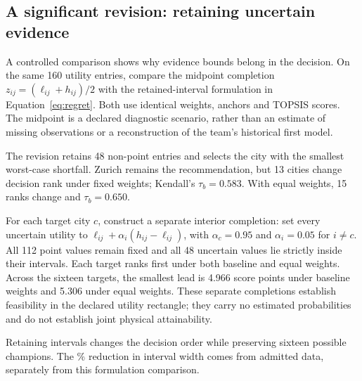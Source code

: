 \subsection{A significant revision: retaining uncertain evidence}
A controlled comparison shows why evidence bounds belong in the decision.
On the same 160 utility entries, compare the midpoint completion $z_{ij}=(\ell_{ij}+h_{ij})/2$ with the retained-interval formulation in Equation~\ref{eq:regret}. Both use identical weights, anchors and TOPSIS scores. The midpoint is a declared diagnostic scenario, rather than an estimate of missing observations or a reconstruction of the team's historical first model.

The revision retains 48 non-point entries and selects the city with the smallest worst-case shortfall. Zurich remains the recommendation, but 13 cities change decision rank under fixed weights; Kendall's $\tau_b=0.583$. With equal weights, 15 ranks change and $\tau_b=0.650$.

For each target city $c$, construct a separate interior completion: set every uncertain utility to $\ell_{ij}+\alpha_i(h_{ij}-\ell_{ij})$, with $\alpha_c=0.95$ and $\alpha_i=0.05$ for $i\ne c$. All 112 point values remain fixed and all 48 uncertain values lie strictly inside their intervals. Each target ranks first under both baseline and equal weights. Across the sixteen targets, the smallest lead is 4.966 score points under baseline weights and 5.306 under equal weights. These separate completions establish feasibility in the declared utility rectangle; they carry no estimated probabilities and do not establish joint physical attainability.

Retaining intervals changes the decision order while preserving sixteen possible champions. The \TotalWidthReduction\% reduction in interval width comes from admitted data, separately from this formulation comparison.
